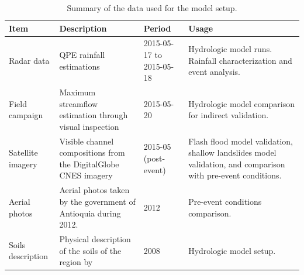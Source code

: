 \documentclass[hess, manuscript]{copernicus}
\begin{document}
    \begin{table}[]
        \centering
        \begin{tabularx}{\textwidth}{p{2.5cm} p{4cm} p{2cm} p{4cm} }
    \hline 
    Item & Description & Period & Usage \\
    \hline
Radar data & QPE rainfall estimations & 2015-05-17 to 2015-05-18 & Hydrologic model runs. Rainfall characterization and event analysis. \\
Field campaign & Maximum streamflow estimation through visual inspection & 2015-05-20 & Hydrologic model comparison for indirect validation. \\
Satellite imagery & Visible channel compositions from the DigitalGlobe CNES imagery & 2015-05 (post-event) & Flash flood model validation, shallow landslides model validation, and comparison with pre-event conditions. \\
Aerial photos & Aerial photos taken by the government of Antioquia during 2012. & 2012 & Pre-event conditions comparison. \\
Soils description & Physical description of the soils of the region by \cite{Osorio2008} & 2008 & Hydrologic model setup. \\
\hline
\end{tabularx}
        \caption{Summary of the data used for the model setup.}
        \label{tab:data}
    \end{table}
\end{document}

